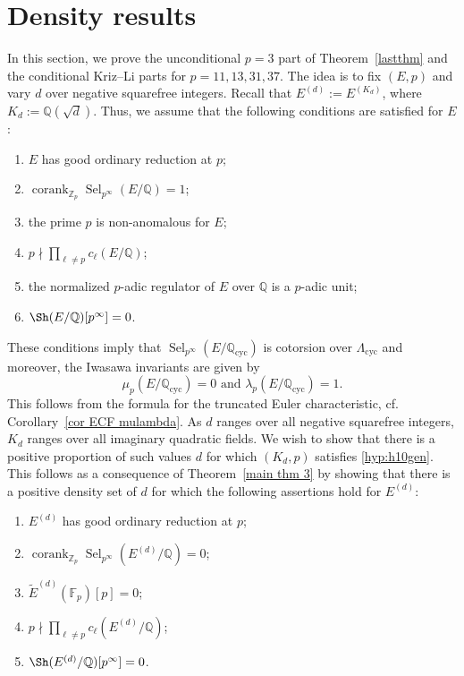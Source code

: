 \documentclass[12pt]{amsart}
\newcommand{\Z}{\mathbb{Z}}
\newcommand{\Q}{\mathbb{Q}}
\newcommand{\F}{\mathbb{F}}
\newcommand{\op}[1]{\operatorname{#1}}
\numberwithin{equation}{section}
\begin{document}
\section{Density results}\label{s 5}
\par In this section, we prove the unconditional $p=3$ part of Theorem~\ref{lastthm} and the conditional Kriz--Li parts for $p=11,13,31,37$. The idea is to fix $(E,p)$ and vary $d$ over negative squarefree integers. Recall that $E^{(d)}:=E^{(K_d)}$, where $K_d:=\Q(\sqrt{d})$. Thus, we assume that the following conditions are satisfied for $E$:
\begin{enumerate}
    \item $E$ has good ordinary reduction at $p$;
    \item $\op{corank}_{\Z_p}\op{Sel}_{p^\infty}(E/\Q)=1$;
    \item the prime $p$ is non-anomalous for $E$;
    \item $p\nmid \prod_{\ell\neq p} c_\ell(E/\Q)$;
    \item the normalized $p$-adic regulator of $E$ over $\Q$ is a $p$-adic unit;
    \item $\Sh(E/\Q)[p^\infty]=0$.
\end{enumerate}

These conditions imply that $\op{Sel}_{p^\infty}(E/\Q_{\op{cyc}})$ is cotorsion over $\Lambda_{\op{cyc}}$ and moreover, the Iwasawa invariants are given by
\[
\mu_p(E/\Q_{\op{cyc}})=0\text{ and }\lambda_p(E/\Q_{\op{cyc}})=1.
\]
This follows from the formula for the truncated Euler characteristic, cf. Corollary~\ref{cor ECF mulambda}. As $d$ ranges over all negative squarefree integers, $K_d$ ranges over all imaginary quadratic fields. We wish to show that there is a positive proportion of such values $d$ for which $(K_d,p)$ satisfies \eqref{hyp:h10gen}. This follows as a consequence of Theorem~\ref{main thm 3} by showing that there is a positive density set of $d$ for which the following assertions hold for $E^{(d)}$:
\begin{enumerate}
    \item $E^{(d)}$ has good ordinary reduction at $p$;
    \item $\op{corank}_{\Z_p}\op{Sel}_{p^\infty}(E^{(d)}/\Q)=0$;
    \item $\widetilde{E}^{(d)}(\F_p)[p]=0$;
    \item $p\nmid \prod_{\ell\neq p} c_\ell(E^{(d)}/\Q)$;
    \item $\Sh(E^{(d)}/\Q)[p^\infty]=0$.
\end{enumerate}
\end{document}
